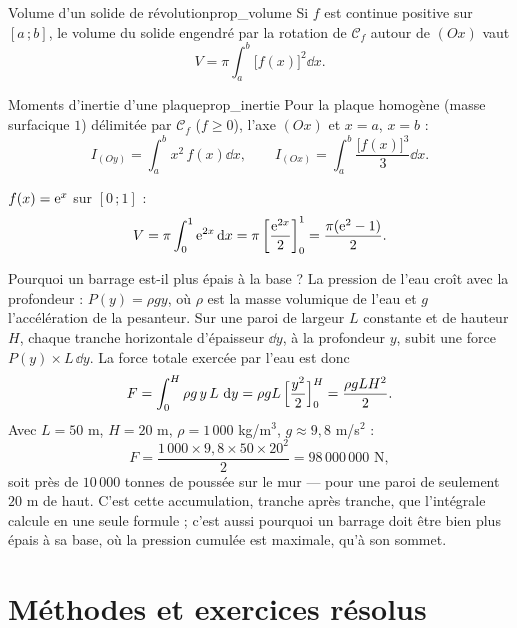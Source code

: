 \begin{propriete}{Volume d'un solide de révolution}{prop_volume}
	Si $f$ est continue positive sur $[a\,;b]$, le volume du solide engendré
	par la rotation de $\mathcal C_f$ autour de $(Ox)$ vaut
	\[
	V=\pi\int_a^b\bigl[f(x)\bigr]^{2}\dd x.
	\]
\end{propriete}

\begin{propriete}{Moments d'inertie d'une plaque}{prop_inertie}
	Pour la plaque homogène (masse surfacique $1$) délimitée par
	$\mathcal C_f$ ($f\geq 0$), l'axe $(Ox)$ et $x=a$, $x=b$ :
	\[
	I_{(Oy)}=\int_a^b x^{2}\,f(x)\dd x,
	\qquad
	I_{(Ox)}=\int_a^b\frac{\bigl[f(x)\bigr]^{3}}{3}\dd x.
	\]
\end{propriete}

\begin{exemple}
	$f(x)=\mathrm{e}^{x}$ sur $[0\,;1]$ :
	\[
	V=\pi\int_0^1\mathrm{e}^{2x}\,\mathrm{d} x=\pi\left[\frac{\mathrm{e}^{2x}}{2}\right]_0^1
	=\frac{\pi(\mathrm{e}^{2}-1)}{2}.
	\]
\end{exemple}

\begin{vraievie}{Pourquoi un barrage est-il plus épais à la base ?}
	La pression de l'eau croît avec la profondeur : $P(y)=\rho g y$, où
	$\rho$ est la masse volumique de l'eau et $g$ l'accélération de la
	pesanteur. Sur une paroi de largeur $L$ constante et de hauteur $H$,
	chaque tranche horizontale d'épaisseur $\dd y$, à la profondeur $y$,
	subit une force $P(y)\times L\,\dd y$. La force totale exercée par
	l'eau est donc
	\[
	F=\int_0^{H}\rho g\,y\,L\,\,\mathrm{d} y=\rho g L\,\Bigl[\frac{y^2}{2}\Bigr]_0^H
	=\frac{\rho g L H^2}{2}.
	\]
	Avec $L=50$ m, $H=20$ m, $\rho=1\,000$ kg/m$^3$, $g\approx 9{,}8$
	m/s$^2$ :
	\[
	F=\frac{1\,000\times 9{,}8\times 50\times 20^2}{2}=98\,000\,000
	\text{ N},
	\]
	soit près de $10\,000$ tonnes de poussée sur le mur --- pour une
	paroi de seulement $20$ m de haut. C'est cette accumulation, tranche
	après tranche, que l'intégrale calcule en une seule formule ; c'est
	aussi pourquoi un barrage doit être bien plus épais à sa base, où la
	pression cumulée est maximale, qu'à son sommet.

\end{vraievie}


\section{Méthodes et exercices résolus}

